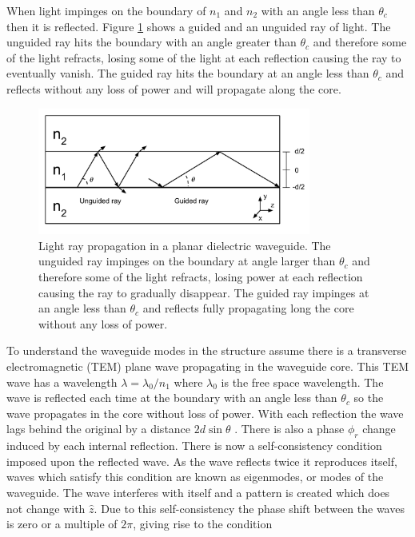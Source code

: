 When light impinges on the boundary of $n_1$ and $n_2$ with an angle less than
$\theta_c$ then it is reflected. Figure \ref{fig:planar_reflection} shows a
guided and an unguided ray of light. The unguided ray hits the boundary with an
angle greater than $\theta_c$ and therefore some of the light refracts,
losing some of the light at each reflection causing the ray to
eventually vanish. The guided ray hits the boundary at an angle less than
$\theta_c$ and reflects without any loss of power and will propagate along the
core.

\begin{figure}[h!] \begin{center}
\includegraphics[width=0.8\textwidth]{images/thesis_planar_reflection.pdf}
\end{center} \caption{
Light ray propagation in a planar dielectric waveguide. The unguided ray
impinges on the boundary at angle larger than $\theta_c$ and therefore some of
the light refracts, losing power at each reflection causing the ray to gradually
disappear. The guided ray impinges at an angle less than $\theta_c$ and reflects
fully propagating long the core without any loss of power.
}
\label{fig:planar_reflection} \end{figure}

To understand the waveguide modes in the structure assume there is a transverse
electromagnetic (TEM) plane wave propagating in the waveguide core. This TEM
wave has a wavelength $\lambda = \lambda_0/n_1$ where $\lambda_0$ is the free
space wavelength. The wave is reflected each time at the boundary with an angle
less than $\theta_c$ so the wave propagates in the core without loss of power.
With each reflection the wave lags behind the original by a distance
$2d\sin{\theta}$ \cite{saleh1991fundamentals}. There is also a phase $\phi_r$
change induced by each internal reflection. There is now a self-consistency
condition imposed upon the reflected wave. As the wave reflects twice it
reproduces itself, waves which satisfy this condition are known as eigenmodes,
or modes of the waveguide. The wave interferes with itself and a pattern is created
which does not change with $\hat{z}$. Due to this self-consistency the phase
shift between the waves is zero or a multiple of $2\pi$, giving rise to the
condition

